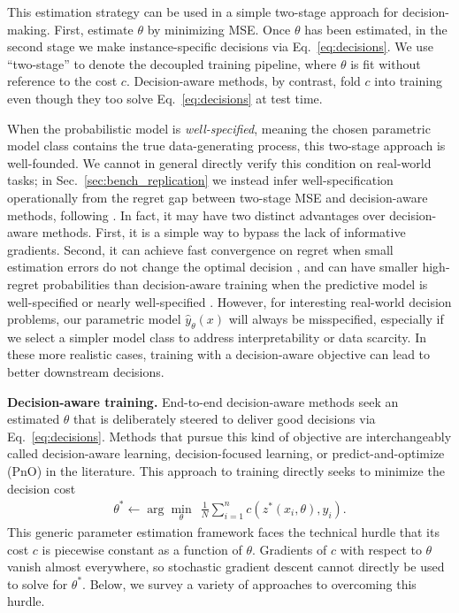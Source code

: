 This estimation strategy can be used in a simple two-stage approach for decision-making. First, estimate $\theta$ by minimizing MSE. Once $\theta$ has been estimated, in the second stage we make instance-specific decisions via Eq.~\eqref{eq:decisions}. We use ``two-stage'' to denote the decoupled training pipeline, where $\theta$ is fit without reference to the cost $c$. Decision-aware methods, by contrast, fold $c$ into training even though they too solve Eq.~\eqref{eq:decisions} at test time.

When the probabilistic model is \emph{well-specified}, meaning the chosen parametric model class contains the true data-generating process, this two-stage approach is well-founded. We cannot in general directly verify this condition on real-world tasks; in Sec.~\ref{sec:bench_replication} we instead infer well-specification operationally from the regret gap between two-stage MSE and decision-aware methods, following \citet{elmachtoubDissectingImpactModel2025}. In fact, it may have two distinct advantages over decision-aware methods. First, it is a simple way to bypass the lack of informative gradients. Second, it can achieve fast convergence on regret when small estimation errors do not change the optimal decision \citep{huFastRatesContextual2022}, and can have smaller high-regret probabilities than decision-aware training when the predictive model is well-specified or nearly well-specified \citep{elmachtoubDissectingImpactModel2025}. However, for interesting real-world decision problems, our parametric model $\hat{y}_{\theta}(x)$ will always be misspecified, especially if we select a simpler model class to address interpretability or data scarcity. In these more realistic cases, training with a decision-aware objective can lead to better downstream decisions.

\textbf{Decision-aware training.}
End-to-end decision-aware methods seek an estimated $\theta$ that is deliberately steered to deliver good decisions via Eq.~\eqref{eq:decisions}. Methods that pursue this kind of objective are interchangeably called decision-aware learning, decision-focused learning, or predict-and-optimize (PnO) in the literature. This approach to training directly seeks to minimize the decision cost
\begin{align}
    \theta^* \gets \arg\!\min_{\theta} ~~ \frac{1}{N} \sum_{i=1}^n c(z^*(x_i,\theta), y_i).
\end{align}
This generic parameter estimation framework faces the technical hurdle that its cost $c$ is piecewise constant as a function of $\theta$. Gradients of $c$ with respect to $\theta$ vanish almost everywhere, so stochastic gradient descent cannot directly be used to solve for $\theta^*$. Below, we survey a variety of approaches to overcoming this hurdle.

